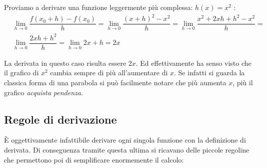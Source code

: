 Proviamo a derivare una funzione leggermente più complessa: $h(x) = x^2$ :
\begin{align*}
	&\lim_{h \to 0} \dfrac{f(x_0 + h) - f(x_0)}{h} = \lim_{h \to 0} 
    \dfrac{(x+h)^2 - x^2}{h} =  \lim_{h \to 0} \dfrac{x^2 +2 x h + h^2 - 
    x^2}{h} =\\
	&\lim_{h \to 0} \dfrac{2xh + h^2}{h} = \lim_{h \to 0} 2x + h =  2x
\end{align*}

La derivata in questo caso risulta essere $2x$. Ed effettivamente ha senso 
visto che il grafico di $x^2$ cambia sempre di più all'aumentare di $x$. Se 
infatti si guarda la classica forma di una parabola si può facilmente notare 
che più aumenta $x$, più il grafico \textit{acquista pendenza}.



\subsection{Regole di derivazione} \label{sec_regoleDerivazione}
È oggettivamente infattibile derivare ogni singola funzione con la definizione 
di derivata. Di conseguenza tramite questa ultima si ricavano delle piccole 
regoline che permettono poi di semplificare enormemente il calcolo:

